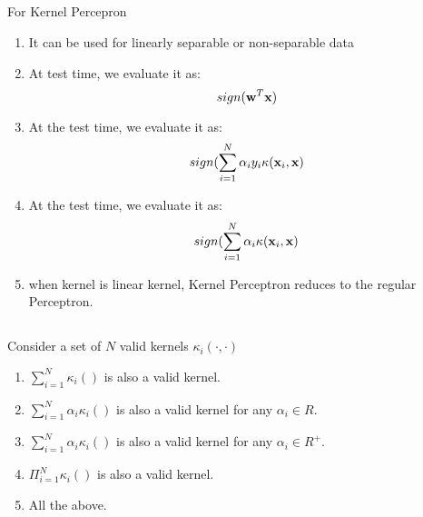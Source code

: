 \begin{frame}
\section{}
For Kernel Percepron
\begin{enumerate}[label=(\Alph*)]
\item It can be used for linearly separable or non-separable data   %
\item At test time, we evaluate it as: \[ sign ({\bf w}^T{\bf x})\]
\item At the test time, we evaluate it as: \[ sign (\sum_{i=1}^N \alpha_i y_i \kappa({\bf x}_i, {\bf x}) \]
\item At the test time, we evaluate it as: \[ sign (\sum_{i=1}^N \alpha_i \kappa({\bf x}_i, {\bf x}) \]   %
\item when kernel is linear kernel, Kernel Perceptron reduces to the regular Perceptron.    %
\end{enumerate}

\end{frame}



\begin{frame}
\section{}
Consider a set of $N$ valid kernels $\kappa_i(\cdot,\cdot)$

\begin{enumerate}[label=(\Alph*)]
\item $\sum_{i=1}^N \kappa_i()$  is also a valid kernel.    %
\item $\sum_{i=1}^N \alpha_i \kappa_i()$  is also a valid kernel for any $\alpha_i \in R$.
\item $\sum_{i=1}^N \alpha_i \kappa_i()$  is also a valid kernel for any $\alpha_i \in R^+$.    %
\item $\Pi_{i=1}^N \kappa_i()$  is also a valid kernel.   %
\item All the above.    %
\end{enumerate}
\end{frame}
